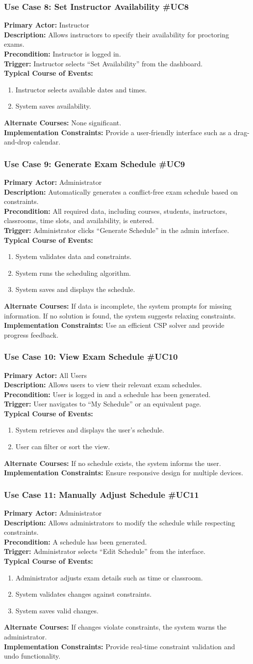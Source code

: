 \documentclass[11pt]{report}
\newcommand{\usecase}[8]{%
\subsubsection*{#1}
\textbf{Primary Actor:} #2\\
\textbf{Description:} #3\\
\textbf{Precondition:} #4\\
\textbf{Trigger:} #5\\
\textbf{Typical Course of Events:}
\begin{enumerate}
#6
\end{enumerate}
\textbf{Alternate Courses:} #7\\
\textbf{Implementation Constraints:} #8
}
\begin{document}
\usecase{Use Case 8: Set Instructor Availability \#UC8}{Instructor}{Allows instructors to specify their availability for proctoring exams.}{Instructor is logged in.}{Instructor selects \textquotedblleft Set Availability\textquotedblright{} from the dashboard.}{\item Instructor selects available dates and times.\item System saves availability.}{None significant.}{Provide a user-friendly interface such as a drag-and-drop calendar.}

\usecase{Use Case 9: Generate Exam Schedule \#UC9}{Administrator}{Automatically generates a conflict-free exam schedule based on constraints.}{All required data, including courses, students, instructors, classrooms, time slots, and availability, is entered.}{Administrator clicks \textquotedblleft Generate Schedule\textquotedblright{} in the admin interface.}{\item System validates data and constraints.\item System runs the scheduling algorithm.\item System saves and displays the schedule.}{If data is incomplete, the system prompts for missing information. If no solution is found, the system suggests relaxing constraints.}{Use an efficient CSP solver and provide progress feedback.}

\usecase{Use Case 10: View Exam Schedule \#UC10}{All Users}{Allows users to view their relevant exam schedules.}{User is logged in and a schedule has been generated.}{User navigates to \textquotedblleft My Schedule\textquotedblright{} or an equivalent page.}{\item System retrieves and displays the user's schedule.\item User can filter or sort the view.}{If no schedule exists, the system informs the user.}{Ensure responsive design for multiple devices.}

\usecase{Use Case 11: Manually Adjust Schedule \#UC11}{Administrator}{Allows administrators to modify the schedule while respecting constraints.}{A schedule has been generated.}{Administrator selects \textquotedblleft Edit Schedule\textquotedblright{} from the interface.}{\item Administrator adjusts exam details such as time or classroom.\item System validates changes against constraints.\item System saves valid changes.}{If changes violate constraints, the system warns the administrator.}{Provide real-time constraint validation and undo functionality.}
\end{document}
